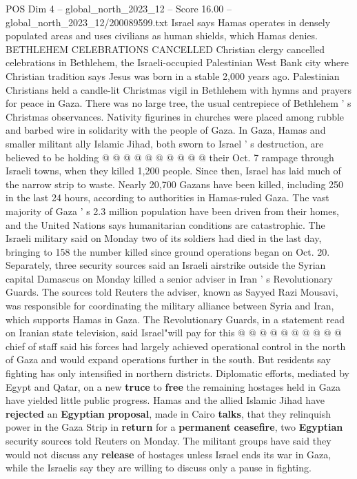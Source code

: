 \begin{textsample}{POS Dim 4 – global\_north\_2023\_12 – Score 16.00 – global\_north\_2023\_12/200089599.txt}
Israel says Hamas operates in densely populated areas and uses civilians as human shields, which Hamas denies.
BETHLEHEM CELEBRATIONS CANCELLED Christian clergy cancelled celebrations in Bethlehem, the Israeli-occupied Palestinian West Bank city where Christian tradition says Jesus was born in a stable 2,000 years ago.
Palestinian Christians held a candle-lit Christmas vigil in Bethlehem with hymns and prayers for peace in Gaza.
There was no large tree, the usual centrepiece of Bethlehem ' s Christmas observances.
Nativity figurines in churches were placed among rubble and barbed wire in solidarity with the people of Gaza.
In Gaza, Hamas and smaller militant ally Islamic Jihad, both sworn to Israel ' s destruction, are believed to be holding @ @ @ @ @ @ @ @ @ @ their Oct. 7 rampage through Israeli towns, when they killed 1,200 people.
Since then, Israel has laid much of the narrow strip to waste.
Nearly 20,700 Gazans have been killed, including 250 in the last 24 hours, according to authorities in Hamas-ruled Gaza.
The vast majority of Gaza ' s 2.3 million population have been driven from their homes, and the United Nations says humanitarian conditions are catastrophic.
The Israeli military said on Monday two of its soldiers had died in the last day, bringing to 158 the number killed since ground operations began on Oct. 20.
Separately, three security sources said an Israeli airstrike outside the Syrian capital Damascus on Monday killed a senior adviser in Iran ' s Revolutionary Guards.
The sources told Reuters the adviser, known as Sayyed Razi Mousavi, was responsible for coordinating the military alliance between Syria and Iran, which supports Hamas in Gaza.
The Revolutionary Guards, in a statement read on Iranian state television, said Israel"will pay for this @ @ @ @ @ @ @ @ @ @ chief of staff said his forces had largely achieved operational control in the north of Gaza and would expand operations further in the south.
But residents say fighting has only intensified in northern districts.
Diplomatic efforts, mediated by Egypt and Qatar, on a new \textbf{truce} to \textbf{free} the remaining hostages held in Gaza have yielded little public progress.
Hamas and the allied Islamic Jihad have \textbf{rejected} an \textbf{Egyptian} \textbf{proposal}, made in Cairo \textbf{talks}, that they relinquish power in the Gaza Strip in \textbf{return} for a \textbf{permanent} \textbf{ceasefire}, two \textbf{Egyptian} security sources told Reuters on Monday.
The militant groups have said they would not discuss any \textbf{release} of hostages unless Israel ends its war in Gaza, while the Israelis say they are willing to discuss only a pause in fighting.

\end{textsample}
